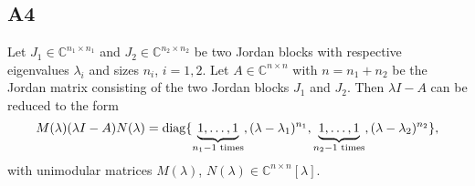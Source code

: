 \documentclass[11pt]{article}
\DeclareMathOperator{\diag}{diag}
\newcommand{\complex}{\mathbb{C}} %
\begin{document}
\subsection*{A4}
Let $J_1 \in \complex^{n_1 \times n_1}$ and $J_2 \in \complex^{n_2 \times n_2}$ be two Jordan blocks with respective eigenvalues $\lambda_i$ and sizes $n_i$, $i = 1,2$. Let $A\in \complex^{n\times n}$ with $n = n_1+n_2$ be the Jordan matrix consisting of the two Jordan blocks $J_1$ and $J_2$. Then $\lambda I - A$ can be reduced to the form
\[
M(\lambda)(\lambda I-A)N(\lambda) = \diag\{\underbrace{1, \dots , 1}_{n_1 - 1 \textnormal{ times}}, (\lambda - \lambda_1)^{n_1}, \underbrace{1, \dots, 1}_{n_2 - 1 \textnormal{ times}}, (\lambda - \lambda_2)^{n_2}\},
\]
with unimodular matrices  $M(\lambda)$, $N(\lambda) \in \complex^{n\times n}[\lambda]$.
\end{document}
